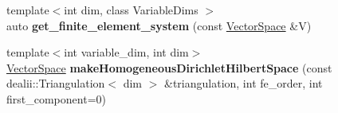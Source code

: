 \begin{DoxyCompactItemize}
\item 
\hypertarget{namespaceSpacy_1_1dealII_ae4b346126212aae19ce54381fe87f556}{{\footnotesize template$<$int dim, class Variable\-Dims $>$ }\\auto {\bfseries get\-\_\-finite\-\_\-element\-\_\-system} (const \hyperlink{classSpacy_1_1VectorSpace}{\-Vector\-Space} \&\-V)}\label{namespaceSpacy_1_1dealII_ae4b346126212aae19ce54381fe87f556}

\item 
\hypertarget{namespaceSpacy_1_1dealII_a84446cd81a46ee9162ea8944f6d92f55}{{\footnotesize template$<$int variable\-\_\-dim, int dim$>$ }\\\hyperlink{classSpacy_1_1VectorSpace}{\-Vector\-Space} {\bfseries make\-Homogeneous\-Dirichlet\-Hilbert\-Space} (const dealii\-::\-Triangulation$<$ dim $>$ \&triangulation, int fe\-\_\-order, int first\-\_\-component=0)}\label{namespaceSpacy_1_1dealII_a84446cd81a46ee9162ea8944f6d92f55}


\end{DoxyCompactItemize}
